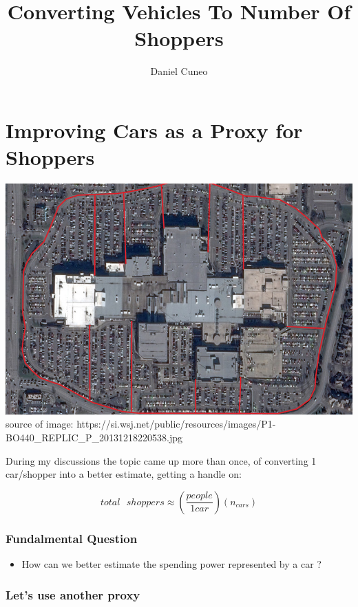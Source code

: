 \documentclass{article}
\title{Converting  Vehicles To Number Of Shoppers}
\author{Daniel Cuneo}
\begin{document}
    \maketitle




    \section{Improving Cars as a Proxy for Shoppers}\label{improving-cars-as-a-proxy-for-shoppers}
    \includegraphics[scale=0.5]{pics/parking_lot.jpg}
 source of image:
https://si.wsj.net/public/resources/images/P1-BO440\_REPLIC\_P\_20131218220538.jpg

During my discussions the topic came up more than once, of converting 1
car/shopper into a better estimate, getting a handle on:

\[total\text{ }shoppers \approx \left(\frac{people}{1{car}}\right)(n_{cars})\]

\subsubsection{Fundalmental Question}\label{fundalmental-question}

\begin{itemize}
\itemsep1pt\parskip0pt
\item
  How can we better estimate the spending power represented by a car ?
\end{itemize}

\subsubsection{Let's use another proxy}\label{lets-use-another-proxy}
\end{document}
